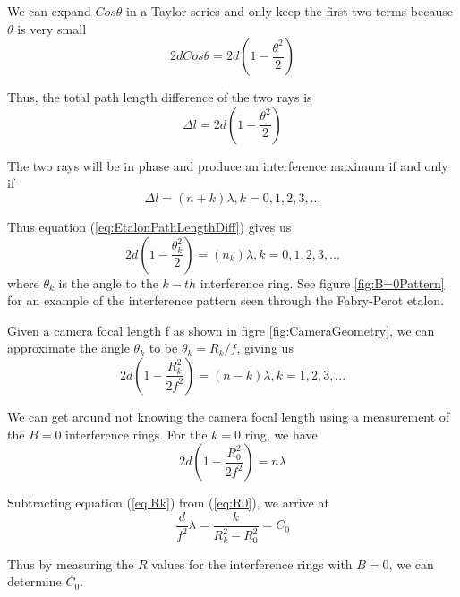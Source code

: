 \documentclass[twocolumn]{article}
\begin{document}
				We can expand $Cos\theta$ in a Taylor series and only keep the first two terms because $\theta$ is very small
				\begin{equation}
					2dCos\theta = 2d\left(1-\frac{\theta^2}{2}\right)
				\end{equation}
				
				Thus, the total path length difference of the two rays is
				\begin{equation}
					\Delta l = 2d\left(1-\frac{\theta^2}{2}\right)
					\label{eq:EtalonPathLengthDiff}
				\end{equation}
				
				The two rays will be in phase and produce an interference maximum if and only if
				\begin{equation}
					\Delta l = (n+k)\lambda, k = 0, 1, 2, 3, ...
				\end{equation}
				
				Thus equation (\ref{eq:EtalonPathLengthDiff}) gives us
				\begin{equation}
					2d\left(1-\frac{\theta_k^2}{2}\right) = (n_k)\lambda, k = 0, 1, 2, 3,...
				\end{equation}
				where $\theta_k$ is the angle to the $k-th$ interference ring.
				See figure \ref{fig:B=0Pattern} for an example of the interference pattern seen through the Fabry-Perot etalon.
				
				Given a camera focal length f as shown in figre \ref{fig:CameraGeometry}, we can approximate the angle $\theta_k$ to be $\theta_k = R_k/f$, giving us
				\begin{equation}
					2d\left(1 - \frac{R_k^2}{2f^2}\right) = (n-k)\lambda, k=1,2,3,...
					\label{eq:Rk}
				\end{equation}
				
				We can get around not knowing the camera focal length using a measurement of the $B=0$ interference rings.
				For the $k=0$ ring, we have
				\begin{equation}
					2d\left(1-\frac{R_0^2}{2f^2}\right) = n\lambda
					\label{eq:R0}
				\end{equation}
				
				Subtracting equation (\ref{eq:Rk}) from (\ref{eq:R0}), we arrive at
				\begin{equation}
					\frac{d}{f^2}\lambda = \frac{k}{R_k^2 - R_0^2} = C_0
					\label{eq:ConstantEq}
				\end{equation}
				
				Thus by measuring the $R$ values for the interference rings with $B=0$, we can determine $C_0$.
				
\end{document}
